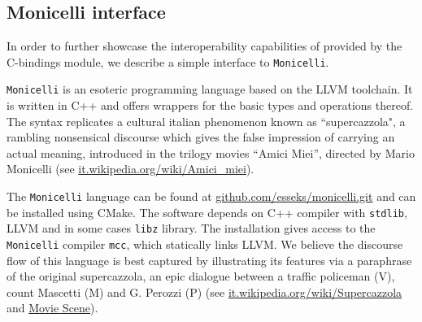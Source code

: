 \documentclass[edipack_sp.tex]{subfiles}
\begin{document}
\begin{appendix}

\section{Monicelli interface}\label{appendixA}
In order to further showcase the interoperability capabilities of
\NAME provided by the C-bindings module, we describe a simple interface to {\tt Monicelli}.
  
{\tt Monicelli} is an esoteric programming language based on the LLVM toolchain.
It is written in C++ and offers wrappers for the basic
types and operations thereof. The syntax replicates a cultural italian
phenomenon known as ``supercazzola", a rambling nonsensical discourse
which gives the false impression of carrying an actual meaning,
introduced in the trilogy movies ``Amici Miei'', directed by Mario
Monicelli (see
\href{https://it.wikipedia.org/wiki/Amici_miei}{it.wikipedia.org/wiki/Amici\_miei}). 

The {\tt Monicelli} language can be found at
\href{https://github.com/esseks/monicelli.git}{github.com/esseks/monicelli.git}
and can be installed using CMake. The software depends on C++
compiler with {\tt stdlib}, LLVM and in some cases {\tt libz} library. The installation gives access to the {\tt
  Monicelli} compiler {\tt mcc}, which statically links LLVM. 
We believe the discourse flow of this language is best captured by 
illustrating its features via a paraphrase of the original supercazzola, an epic dialogue between a traffic policeman (V), count Mascetti (M) and G. Perozzi (P) (see
\href{https://it.wikipedia.org/wiki/Supercazzola#Origine}{it.wikipedia.org/wiki/Supercazzola}
and \href{https://www.youtube.com/watch?v=SF8YUFdP6eU}{Movie Scene}). 


\end{appendix}
\end{document}
